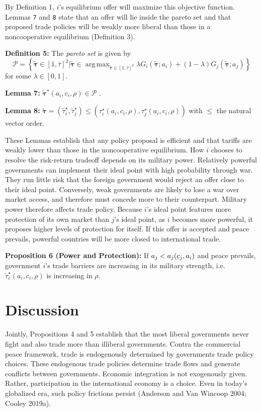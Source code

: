 \documentclass{puthesis}
\DeclareMathOperator*{\argmax}{arg\,max}
\DeclareRobustCommand{\ubar}[1]{\underaccent{\bar}{#1}}
\begin{document}
By Definition 1, \(i\)'s equilibrium offer will maximize this objective
function. Lemmas \texttt{7} and \texttt{8} state that an offer will lie
inside the pareto set and that proposed trade policies will be weakly
more liberal than those in a noncooperative equilibrium (Definition 3).

\textbf{Definition 5:} The \emph{pareto set} is given by \[
\mathcal{P} = \left\{ \tilde{\bm{\tau}} \in [1, \bar{\tau}]^2 | \tilde{\bm{\tau}} \in \argmax_{\tilde{\bm{\tau}} \in [1, \bar{\tau}]^2} \lambda G_i(\tilde{\bm{\tau}}; a_i) + (1 - \lambda) G_j(\tilde{\bm{\tau}}; a_j) \right\}
\] for some \(\lambda \in [0, 1]\).

\textbf{Lemma 7:}
\(\tilde{\bm{\tau}}^\star(a_i, c_i, \rho) \in \mathcal{P}\) .

\textbf{Lemma 8:}
\(\tilde{\bm{\tau}} = \left( \tilde{\tau}_i^\star, \tilde{\tau}_j^\star \right) \leq \left( \tau_i^\star(a_i, c_i, \rho), \tau_j^\star(a_i, c_i, \rho) \right)\)
with \(\leq\) the natural vector order.

These Lemmas establish that any policy proposal is efficient and that
tariffs are weakly lower than those in the noncooperative equilibrium.
How \(i\) chooses to resolve the risk-return tradeoff depends on its
military power. Relatively powerful governments can implement their
ideal point with high probability through war. They run little risk that
the foreign government would reject an offer close to their ideal point.
Conversely, weak governments are likely to lose a war over market
access, and therefore must concede more to their counterpart. Military
power therefore affects trade policy. Because \(i\)'s ideal point
features more protection of its own market than \(j\)'s ideal point, as
\(i\) becomes more powerful, it proposes higher levels of protection for
itself. If this offer is accepted and peace prevails, powerful countries
will be more closed to international trade.

\textbf{Proposition 6 (Power and Protection):} If
\(a_j < a_j(\ubar{c}_j, a_i)\) and peace prevails, government \(i\)'s
trade barriers are increasing in its military strength,
i.e.~\(\tilde{\tau}_i^\star(a_i, c_i, \rho)\) is increasing in \(\rho\).

\section{Discussion}

Jointly, Propositions 4 and 5 establish that the most liberal
governments never fight and also trade more than illiberal governments.
Contra the commercial peace framework, trade is endogenously determined
by governments trade policy choices. These endogenous trade policies
determine trade flows and generate conflicts between governments.
Economic integration is not exogenously given. Rather, participation in
the international economy is a choice. Even in today's globalized era,
such policy frictions persist (Anderson and Van Wincoop 2004; Cooley
2019a).
\end{document}
